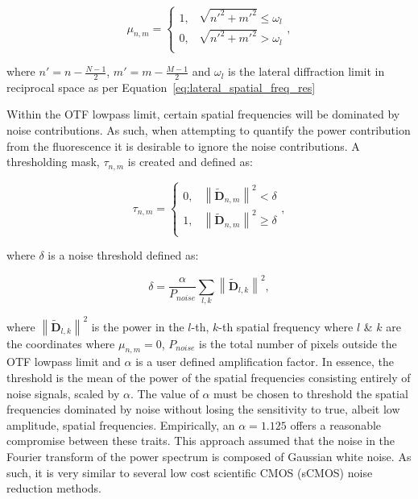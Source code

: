 \begin{equation}\label{eq:circular_mask}
\mu_{n,m} = 
\begin{cases}
1, & \sqrt{n'^{2} + m'^{2}} \le \omega_{l}\\
0, & \sqrt{n'^{2} + m'^{2}} > \omega_{l}\\ 
\end{cases},
\end{equation}

where $n' = n - \frac{N-1}{2}$, $m' = m - \frac{M-1}{2}$ and $\omega_{l}$ 
is the lateral diffraction limit in reciprocal space as per
Equation~\ref{eq:lateral_spatial_freq_res} 

Within the OTF lowpass limit, certain spatial frequencies will be dominated
by noise contributions. As such, when attempting to quantify the power 
contribution from the fluorescence it is desirable to ignore the noise
contributions. A thresholding mask, $\tau_{n,m}$ is created and defined as:

\begin{equation}\label{eq:noise_threshold_mask}
\tau_{n,m} = 
\begin{cases}
0, & \left\| \tilde{\textbf{D}}_{n,m} \right\|^2 < \delta\\
1, & \left\| \tilde{\textbf{D}}_{n,m} \right\|^2 \ge \delta\\ 
\end{cases},
\end{equation}

where $\delta$ is a noise threshold defined as:

\begin{equation}\label{eq:noise_threshold}
\delta = \frac{\alpha}{P_{noise}}\sum\limits_{l,k}{\left\| \tilde{\textbf{D}}_{l,k} \right\|^2},
\end{equation}

where $\left\| \tilde{\textbf{D}}_{l,k} \right\|^2$ is the power in the 
$l$-th, $k$-th spatial frequency where $l$ \& $k$ are the coordinates 
where $\mu_{n,m} = 0$, $P_{noise}$ is the total number of pixels 
outside the OTF lowpass limit and $\alpha$ is a user defined 
amplification factor. In essence, the threshold is the mean of the
power of the spatial frequencies consisting entirely of noise signals,
scaled by $\alpha$.	The value of $\alpha$ must be chosen to threshold
the spatial frequencies dominated by noise without losing the sensitivity
to true, albeit low amplitude, spatial frequencies. Empirically, an 
$\alpha = 1.125$ offers a reasonable compromise between these traits. This approach assumed that the noise in the Fourier transform of the power spectrum is composed of Gaussian white noise. As such, it is very similar to several low cost scientific CMOS (sCMOS) noise reduction methods\cite{liu2017scmos,mandracchia2020fast}.


